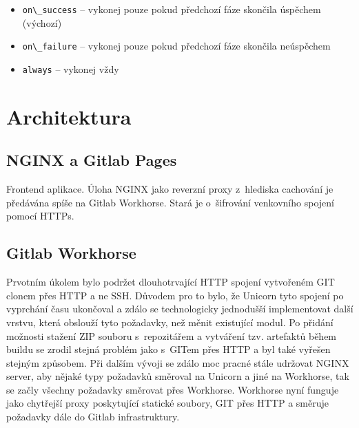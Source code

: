 \begin{itemize}
  \item \verb|on\_success| -- vykonej pouze pokud předchozí fáze skončila úspěchem (výchozí) 
  \item \verb|on\_failure| -- vykonej pouze pokud předchozí fáze skončila neúspěchem
  \item \verb|always| -- vykonej vždy
\end{itemize}

\section{Architektura}



\subsection{NGINX a Gitlab Pages}

Frontend aplikace. Úloha NGINX jako reverzní proxy z~hlediska cachování je předávána spíše na Gitlab Workhorse.
Stará je o~šifrování venkovního spojení pomocí HTTPs.

\subsection{Gitlab Workhorse}

Prvotním úkolem bylo podržet dlouhotrvající HTTP spojení vytvořeném GIT clonem přes HTTP a ne SSH.
Důvodem pro to bylo, že Unicorn tyto spojení po vyprchání času ukončoval a zdálo se technologicky jednodušší implementovat další vrstvu, která obslouží tyto požadavky, než měnit existující modul.
Po přidání možnosti stažení ZIP souboru s~repozitářem a vytváření tzv. artefaktů během buildu se zrodil stejná problém jako s~GITem přes HTTP a byl také vyřešen stejným způsobem.
Při dalším vývoji se zdálo moc pracné stále udržovat NGINX server, aby nějaké typy požadavků směroval na Unicorn a jiné na Workhorse, tak se začly všechny požadavky směrovat přes Workhorse.
Workhorse nyní funguje jako chytřejší proxy poskytující statické soubory, GIT přes HTTP a směruje požadavky dále do Gitlab infrastruktury.


